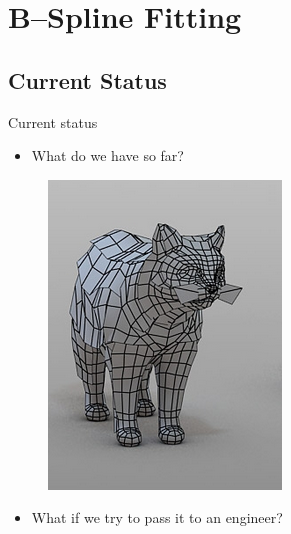 \section{B--Spline Fitting}
\newcommand{\norm}[1]{\parallel #1 \parallel_2}

\subsection{Current Status}
\begin{frame}{Current status}
\begin{minipage}[t]{0.4\linewidth}

\begin{itemize}
\item What do we have so far?
\end{itemize}
\vspace{5mm}
\begin{figure}
\includegraphics[width=0.8\linewidth]{Pictures/cat.png}
\end{figure}
\end{minipage}%
\pause
\begin{minipage}[t]{0.6\linewidth}
\begin{itemize}
\item What if we try to pass it to an engineer?
\end{itemize}


\end{minipage}
\end{frame}
